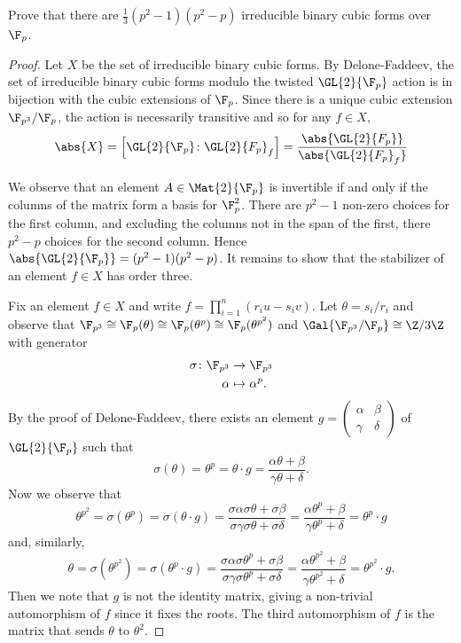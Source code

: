 \documentclass[10pt]{amsart}
\begin{document}
\setcounter{thm}{5}
\begin{thm}[5 Points]
  Prove that there are $\frac{1}{3}(p^2 - 1)(p^2 - p)$ irreducible binary cubic forms over $\F_p$.

  \begin{proof}
    Let $X$ be the set of irreducible binary cubic forms.
    By Delone-Faddeev, the set of irreducible binary cubic forms modulo the twisted $\GL{2}{\F_p}$ action is in bijection with the cubic extensions of $\F_p$.
    Since there is a unique cubic extension $\F_{p^3}/\F_p$, the action is necessarily transitive and so for any $f \in X$,
    $$\abs{X} = \left[\GL{2}{\F_p} \colon \GL{2}{F_p}_f \right] = \frac{\abs{\GL{2}{F_p}}}{\abs{\GL{2}{F_p}_f}}$$
    
    We observe that an element $A \in \Mat{2}{\F_p}$ is invertible if and only if the columns of the matrix form a basis for $\F_p^2$.
    There are $p^2 - 1$ non-zero choices for the first column, and excluding the columns not in the span of the first, there $p^2 - p$ choices for the second column.
    Hence $\abs{\GL{2}{\F_p}} = (p^2 - 1)(p^2 - p)$.
    It remains to show that the stabilizer of an element $f \in X$ has order three.
    
    Fix an element $f \in X$ and write $f = \prod_{i=1}^n(r_iu - s_iv)$.
    Let $\theta = s_i/r_i$ and observe that $\F_{p^3} \cong \F_p(\theta) \cong \F_p(\theta^p) \cong \F_p(\theta^{p^2})$ and $\Gal{\F_{p^3}/\F_p} \cong \Z/3\Z$ with generator
    \begin{align*}
      \sigma \colon \F_{p^3} & \rightarrow \F_{p^3}\\
      \alpha &\mapsto \alpha^p.
    \end{align*}
    By the proof of Delone-Faddeev, there exists an element $g = \left(\begin{array}{cc}\alpha & \beta\\ \gamma & \delta\end{array}\right)$ of $\GL{2}{\F_p}$ such that
      $$\sigma(\theta) = \theta^p = \theta \cdot g = \frac{\alpha \theta + \beta}{\gamma \theta + \delta}.$$
      Now we observe that 
      $$\theta^{p^2} = \sigma(\theta^p) = \sigma(\theta \cdot g) = \frac{\sigma\alpha \sigma\theta + \sigma\beta}{\sigma\gamma\sigma\theta + \sigma\delta} = \frac{\alpha\theta^p + \beta}{\gamma\theta^p + \delta} = \theta^p \cdot g$$
      and, similarly,
      $$\theta = \sigma(\theta^{p^2}) = \sigma(\theta^p \cdot g) = \frac{\sigma\alpha \sigma\theta^p + \sigma\beta}{\sigma\gamma\sigma\theta^p + \sigma\delta} = \frac{\alpha\theta^{p^2} + \beta}{\gamma\theta^{p^2} + \delta} = \theta^{p^2} \cdot g.$$
      Then we note that $g$ is not the identity matrix, giving a non-trivial automorphism of $f$ since it fixes the roots.
      The third automorphism of $f$ is the matrix that sends $\theta$ to $\theta^2$.
  \end{proof}
\end{thm}
\end{document}

